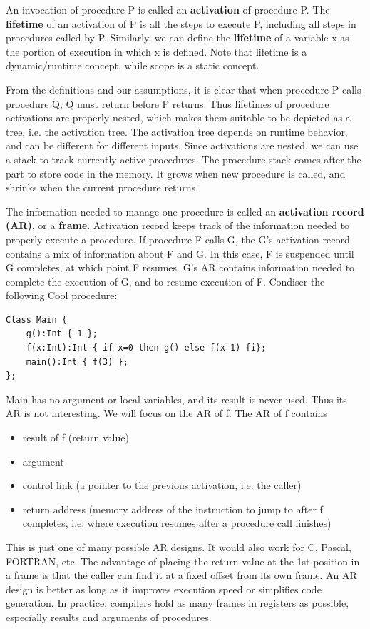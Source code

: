 An invocation of procedure P is called an \textbf{activation} of procedure P. The \textbf{lifetime} of an activation of P is all the steps to execute P, including all steps in procedures called by P. Similarly, we can define the \textbf{lifetime} of a variable x as the portion of execution in which x is defined. Note that lifetime is a dynamic/runtime concept, while scope is a static concept. 

From the definitions and our assumptions, it is clear that when procedure P calls procedure Q, Q must return before P returns. Thus lifetimes of procedure activations are properly nested, which makes them suitable to be depicted as a tree, i.e. the activation tree. The activation tree depends on runtime behavior, and can be different for different inputs. Since activations are nested, we can use a stack to track currently active procedures. The procedure stack comes after the part to store code in the memory. It grows when new procedure is called, and shrinks when the current procedure returns.

The information needed to manage one procedure is called an \textbf{activation record (AR)}, or a \textbf{frame}. Activation record keeps track of the information needed to properly execute a procedure. If procedure F calls G, the G's activation record contains a mix of information about F and G. In this case, F is suspended until G completes, at which point F resumes. G's AR contains information needed to complete the execution of G, and to resume execution of F. Condiser the following Cool procedure:
\begin{lstlisting}
Class Main {
	g():Int { 1 };
	f(x:Int):Int { if x=0 then g() else f(x-1) fi};
	main():Int { f(3) };
};
\end{lstlisting}

Main has no argument or local variables, and its result is never used. Thus its AR is not interesting. We will focus on the AR of f. The AR of f contains
\begin{itemize}
\item result of f (return value)
\item argument
\item control link (a pointer to the previous activation, i.e. the caller)
\item return address (memory address of the instruction to jump to after f completes, i.e. where execution resumes after a procedure call finishes)
\end{itemize}

This is just one of many possible AR designs. It would also work for C, Pascal, FORTRAN, etc. The advantage of placing the return value at the 1st position in a frame is that the caller can find it at a fixed offset from its own frame. An AR design is better as long as it improves execution speed or simplifies code generation. In practice, compilers hold as many frames in registers as possible, especially results and arguments of procedures.

